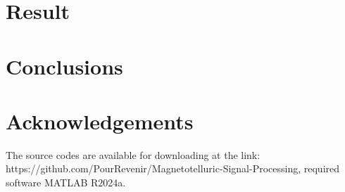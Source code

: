 \documentclass[9pt,a4paper,twoside]{rho-class/rho}
\begin{document}
\nolinenumbers

\linenumbers

\section{Result}

\section{Conclusions}

\section{Acknowledgements}

\begin{rhoenv}[frametitle=Code availability]
    The source codes are available for downloading at the link: https://github.com/PourRevenir/Magnetotelluric-Signal-Processing, required software MATLAB R2024a.
\end{rhoenv}

    
        

            
\end{document}
